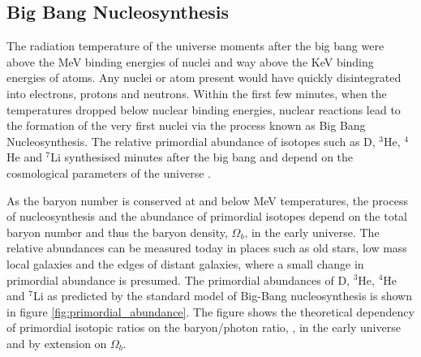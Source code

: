 \subsection{Big Bang Nucleosynthesis}
\label{subsec:BBN}

The radiation temperature of the universe moments after the big bang were above the MeV binding energies of nuclei and way above the KeV binding energies of atoms. Any nuclei or atom present would have quickly disintegrated into electrons, protons and neutrons. Within the first few minutes, when the temperatures dropped below nuclear binding energies, nuclear reactions lead to the formation of the very first nuclei via the process known as Big Bang Nucleosynthesis. The relative primordial abundance of isotopes such as D, $^{3}$He, $^{4}$He and $^{7}$Li synthesised minutes after the big bang and depend on the cosmological parameters of the universe \cite{pns}. 

As the baryon number is conserved at and below MeV temperatures, the process of nucleosynthesis and the abundance of primordial isotopes depend on the total baryon number and thus the baryon density, $\Omega_{b}$, in the early universe. The relative abundances can be measured today in places such as old stars, low mass local galaxies and the edges of distant galaxies, where a small change in primordial abundance is presumed. The primordial abundances of D, $^{3}$He, $^{4}$He and $^{7}$Li as predicted by the standard model of Big-Bang nucleosynthesis is shown in figure \ref{fig:primordial_abundance}. The figure shows the theoretical dependency of primordial isotopic ratios on the baryon/photon ratio, \eta, in the early universe and by extension on $\Omega_{b}$.

